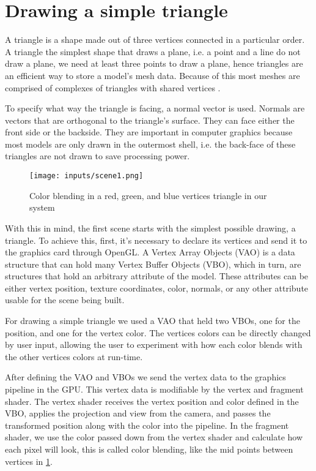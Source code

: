 \documentclass[cic,tc,english]{iiufrgs}
\begin{document}
\section{Drawing a simple triangle}
\label{trianglecolorblendscene}
A triangle is a shape made out of three vertices connected in a particular order. A triangle the simplest shape that draws a plane, i.e. a point and a line do not draw a plane, we need at least three points to draw a plane, hence triangles are an efficient way to store a model's mesh data. Because of this most meshes are comprised of complexes of triangles with shared vertices \cite{Marschner2021CGFundamentals}.

To specify what way the triangle is facing, a normal vector is used. Normals are vectors that are orthogonal to the triangle's surface. They can face either the front side or the backside. They are important in computer graphics because most models are only drawn in the outermost shell, i.e. the back-face of these triangles are not drawn to save processing power.

\begin{figure}[h!]
    \caption{Color blending in a red, green, and blue vertices triangle in our system}
    \begin{center}
        \texttt{[image: inputs/scene1.png]}
    \end{center}
    \label{trianglecolorblend}
\end{figure}

With this in mind, the first scene starts with the simplest possible drawing, a triangle. To achieve this, first, it's necessary to declare its vertices and send it to the graphics card through OpenGL. A Vertex Array Objects (VAO) is a data structure that can hold many Vertex Buffer Objects (VBO), which in turn, are structures that hold an arbitrary attribute of the model. These attributes can be either vertex position, texture coordinates, color, normals, or any other attribute usable for the scene being built.

For drawing a simple triangle we used a VAO that held two VBOs, one for the position, and one for the vertex color. The vertices colors can be directly changed by user input, allowing the user to experiment with how each color blends with the other vertices colors at run-time.

After defining the VAO and VBOs we send the vertex data to the graphics pipeline in the GPU. This vertex data is modifiable by the vertex and fragment shader. The vertex shader receives the vertex position and color defined in the VBO, applies the projection and view from the camera, and passes the transformed position along with the color into the pipeline. In the fragment shader, we use the color passed down from the vertex shader and calculate how each pixel will look, this is called color blending, like the mid points between vertices in \cref{trianglecolorblend}.
\end{document}
